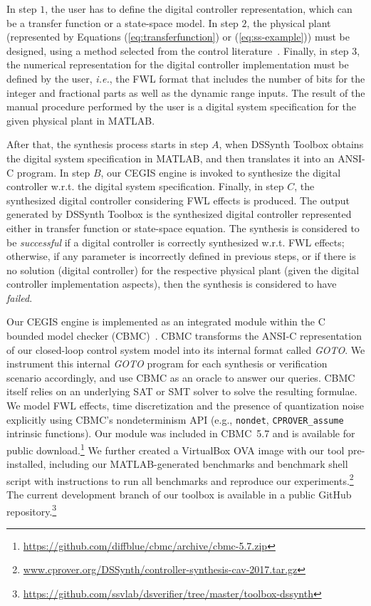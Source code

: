 \documentclass[10pt,conference]{IEEEtran}
\newcommand\tool{{DSSynth Toolbox}\xspace}
\begin{document}
In step $1$, the user has to define the digital controller representation,
which can be a transfer function or a state-space model.  In step $2$, the
physical plant (represented by Equations (\ref{eq:transferfunction}) or
(\ref{eq:ss-example})) must be designed, using a method selected from the
control literature~\cite{astrom1997computer}.  Finally, in step $3$, the
numerical representation for the digital controller implementation must be
defined by the user, {\it i.e.}, the FWL format that includes the number of
bits for the integer and fractional parts as well as the dynamic range
inputs.  The result of the manual procedure performed by the user is a
digital system specification for the given physical plant in MATLAB.

After that, the synthesis process starts in step $A$, when \tool obtains the
digital system specification in MATLAB, and then translates it into an
ANSI-C program.  In step $B$, our CEGIS engine is invoked to synthesize the
digital controller w.r.t.  the digital system specification.  Finally, in
step $C$, the synthesized digital controller considering FWL effects is
produced.  The output generated by \tool is the synthesized digital
controller represented either in transfer function or state-space equation. 
The synthesis is considered to be \emph{successful} if a digital controller
is correctly synthesized w.r.t.  FWL effects; otherwise, if any parameter is
incorrectly defined in previous steps, or if there is no solution (digital
controller) for the respective physical plant (given the digital controller
implementation aspects), then the synthesis is considered to have
\emph{failed}.

Our CEGIS engine is implemented as an integrated module within the C bounded
model checker (CBMC)~\cite{cbmc}.  CBMC transforms the ANSI-C representation
of our closed-loop control system model into its internal format called
\emph{GOTO}.  We instrument this internal \emph{GOTO} program for each
synthesis or verification scenario accordingly, and use CBMC as an oracle to
answer our queries.  CBMC itself relies on an underlying SAT or SMT solver
to solve the resulting formulae.  We model FWL effects, time discretization
and the presence of quantization noise explicitly using CBMC's
nondeterminism API (e.g., \texttt{nondet}, \texttt{CPROVER\_assume}
intrinsic functions).  Our module was included in CBMC~5.7 and is available
for public
download.\footnote{\url{https://github.com/diffblue/cbmc/archive/cbmc-5.7.zip}}
We further created a VirtualBox OVA image with our tool pre-installed,
including our MATLAB-generated benchmarks and benchmark shell script with
instructions to run all benchmarks and reproduce our
experiments.\footnote{\url{www.cprover.org/DSSynth/controller-synthesis-cav-2017.tar.gz}}
The current development branch of our toolbox is available in a public
GitHub
repository.\footnote{\url{https://github.com/ssvlab/dsverifier/tree/master/toolbox-dssynth}}
\end{document}
